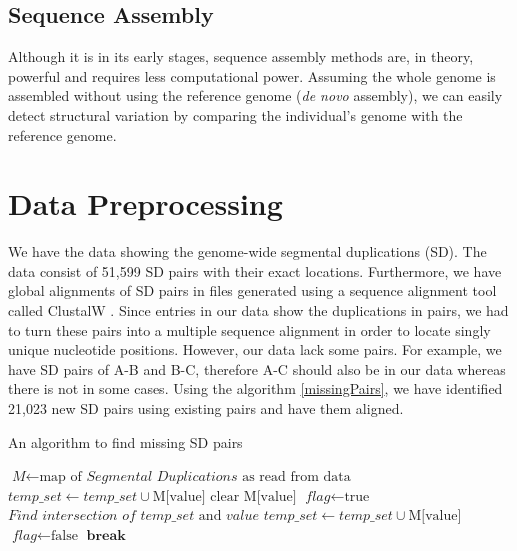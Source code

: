 \subsection{Sequence Assembly}
Although it is in its early stages, sequence assembly methods are, in theory, powerful and requires less computational power. Assuming the whole genome is assembled without using the reference genome (\textit{de novo} assembly), we can easily detect structural variation by comparing the individual's genome with the reference genome.

\section{Data Preprocessing}
We have the data showing the genome-wide segmental duplications (SD). The data consist of 51,599 SD pairs with their exact locations. Furthermore, we have global alignments of SD pairs in files generated using a sequence alignment tool called ClustalW \cite{thompson1994clustal}. Since entries in our data show the duplications in pairs, we had to turn these pairs into a multiple sequence alignment in order to locate singly unique nucleotide positions. However, our data lack some pairs. For example, we have SD pairs of A-B and B-C, therefore A-C should also be in our data whereas there is not in some cases. Using the algorithm \ref{missingPairs}, we have identified 21,023 new SD pairs using existing pairs and have them aligned.

\begin{algorithm}
\caption{An algorithm to find missing SD pairs}
\label{missingPairs}
\begin{algorithmic}[1]
\State $\textit{M} \gets \text{map of }\textit{Segmental Duplications}\text{ as read from data}$
\State $\textit{temp\_set} \gets \textit{temp\_set} \cup \text{M{[value]}}$
\State $\text{clear M{[value]}}$
\EndFor
{}
\State $\textit{flag} \gets \text{true}$
\State $\textit{Find intersection of }\textit{temp\_set}\text{ and }\textit{value}$
\State $\textit{temp\_set} \gets \textit{temp\_set} \cup \text{M{[value]}}$
\State $\textit{flag} \gets \text{false}$
\EndIf
\EndFor
{}
\State $\textbf{break}$
\EndIf
\EndWhile
\EndFor
\EndProcedure
\end{algorithmic}
\end{algorithm}

